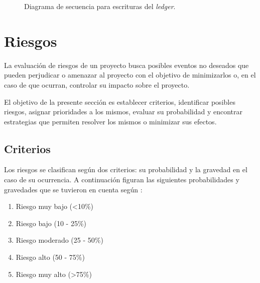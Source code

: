 \begin{figure}[H]
    \caption{Diagrama de secuencia para escrituras del \textit{ledger}.}
    \label{fig:secuencia2}
\end{figure}

\section{Riesgos}
La evaluación de riesgos de un proyecto busca posibles eventos no deseados que pueden perjudicar o amenazar al proyecto con el objetivo de minimizarlos o, en el caso de que ocurran, controlar su impacto sobre el proyecto.

El objetivo de la presente sección es establecer criterios, identificar posibles riesgos, asignar prioridades a los mismos, evaluar su probabilidad y encontrar estrategias que permiten resolver los mismos o minimizar sus efectos.

\subsection{Criterios}
Los riesgos se clasifican según dos criterios: su probabilidad y la gravedad en el caso de su ocurrencia. A continuación figuran las siguientes probabilidades y gravedades que se tuvieron en cuenta según \cite{sommerville}:

\begin{enumerate}
    \item Riesgo muy bajo (\textless10\%)
    \item Riesgo bajo (10 - 25\%)
    \item Riesgo moderado (25 - 50\%)
    \item Riesgo alto (50 - 75\%)
    \item Riesgo muy alto (\textgreater75\%)
\end{enumerate}


